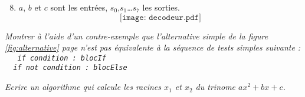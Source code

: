\begin{td}
\begin{minipage}[t]{8cm}
\begin{enumerate}\setcounter{enumi}{7}
\item $a$, $b$ et $c$ sont les entrées, $s_0$,$s_1$\ldots $s_7$ les sorties.
	$$\texttt{[image: decodeur.pdf]}$$
\end{enumerate}
\end{minipage}
\end{td}

\begin{td}\label{td:reciproque}\em {}
Montrer à l'aide d'un contre-exemple que l'alternative simple
de la figure \ref{fig:alternative} page \pageref{fig:alternative}
n'est pas équivalente à la séquence de tests simples suivante :\\
{\tt
\mbox{}\ \ if condition : blocIf\\
\mbox{}\ \ if not condition : blocElse
}
\end{td}

\begin{td}\label{td:trinome}\em {}
Ecrire un algorithme qui calcule les racines $x_1$ et $x_2$ du trinome $ax^2 + bx + c$.
\end{td}

